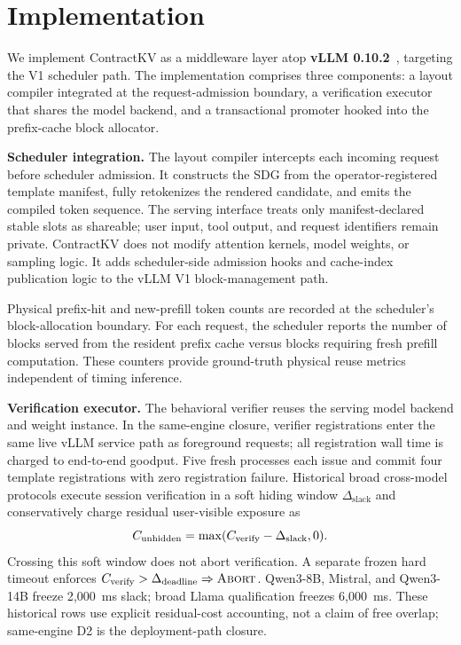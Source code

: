 \documentclass[journal]{IEEEtran}
\begin{document}
\section{Implementation}
\label{sec:implementation}

We implement ContractKV as a middleware layer atop \textbf{vLLM 0.10.2}~\cite{vllm2023}, targeting the V1 scheduler path. The implementation comprises three components: a layout compiler integrated at the request-admission boundary, a verification executor that shares the model backend, and a transactional promoter hooked into the prefix-cache block allocator.

\smallskip
\noindent\textbf{Scheduler integration.}
The layout compiler intercepts each incoming request before scheduler admission. It constructs the SDG from the operator-registered template manifest, fully retokenizes the rendered candidate, and emits the compiled token sequence. The serving interface treats only manifest-declared stable slots as shareable; user input, tool output, and request identifiers remain private. ContractKV does not modify attention kernels, model weights, or sampling logic. It adds scheduler-side admission hooks and cache-index publication logic to the vLLM V1 block-management path.

Physical prefix-hit and new-prefill token counts are recorded at the scheduler's block-allocation boundary. For each request, the scheduler reports the number of blocks served from the resident prefix cache versus blocks requiring fresh prefill computation. These counters provide ground-truth physical reuse metrics independent of timing inference.

\smallskip
\noindent\textbf{Verification executor.}
The behavioral verifier reuses the serving model backend and weight instance. In the same-engine closure, verifier registrations enter the same live vLLM service path as foreground requests; all registration wall time is charged to end-to-end goodput. Five fresh processes each issue and commit four template registrations with zero registration failure. Historical broad cross-model protocols execute session verification in a soft hiding window $\Delta_{\text{slack}}$ and conservatively charge residual user-visible exposure as
\begin{equation}
C_{\rm unhidden}=\max(C_{\rm verify}-\Delta_{\rm slack},0).
\end{equation}
Crossing this soft window does not abort verification. A separate frozen hard timeout enforces $C_{\rm verify}>\Delta_{\rm deadline}\Rightarrow\textsc{Abort}$. Qwen3-8B, Mistral, and Qwen3-14B freeze 2{,}000~ms slack; broad Llama qualification freezes 6{,}000~ms. These historical rows use explicit residual-cost accounting, not a claim of free overlap; same-engine D2 is the deployment-path closure.
\end{document}
